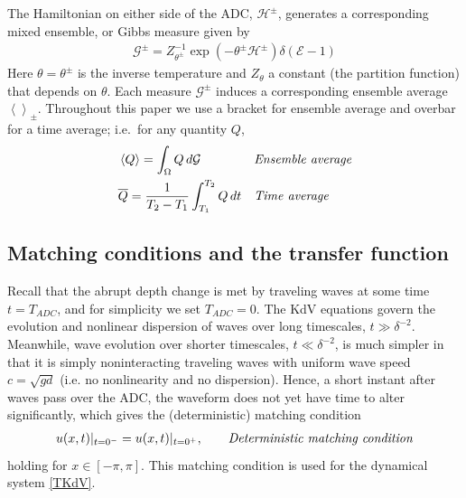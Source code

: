 \documentclass[11pt]{article}
\newcommand{\mean}[1]{\left< #1 \right>}
\newcommand{\depth}{d}
\newcommand{\En}{\mathcal{E}}
\newcommand{\Ham}{\mathcal{H}}
\newcommand{\Hupdn}{\Ham^{\pm}}
\newcommand{\Gibbs}{\mathcal{G}}
\newcommand{\Gupdn}{\Gibbs^{\pm}}
\newcommand{\thupdn}{\theta^{\pm}}
\newcommand{\tavg}[1]{\overline{#1}}
\begin{document}
The Hamiltonian on either side of the ADC, $\Ham^{\pm}$, generates a corresponding mixed ensemble, or Gibbs measure given by 
\begin{align}
\Gupdn = Z_{\thupdn}^{-1} \exp(-\thupdn \Hupdn) \delta(\En - 1)
\end{align}
Here $\theta = \thupdn$ is the inverse temperature and $Z_{\theta}$ a constant (the partition function) that depends on $\theta$. Each measure $\Gupdn$ induces a corresponding ensemble average $\mean{}_{\pm}$. Throughout this paper we use a bracket for ensemble average and overbar for a time average; i.e.~for any quantity $Q$,
\begin{align}
&\mean{Q} = \int_{\Omega}  Q \, d \Gibbs
&&\mbox{\em Ensemble average} \\
&\tavg{Q} = \frac{1}{T_2-T_1} \int_{T_1}^{T_2} Q \, dt	 
&&\mbox{\em Time average}
\end{align}



\subsection{Matching conditions and the transfer function}

Recall that the abrupt depth change is met by traveling waves at some time $t = T_{ADC}$, and for simplicity we set $T_{ADC} = 0$. The KdV equations govern the evolution and nonlinear dispersion of waves over long timescales, $t \gg \delta^{-2}$. Meanwhile, wave evolution over shorter timescales, $t \ll \delta^{-2}$, is much simpler in that it is simply noninteracting traveling waves with uniform wave speed $c = \sqrt{g \depth}$ (i.e. no nonlinearity and no dispersion). Hence, a short instant after waves pass over the ADC, the waveform does not yet have time to alter significantly, which gives the (deterministic) matching condition
\begin{align}
u(x,t) \vert_{t=0^-} = u(x,t) \vert_{t=0^+},
\qquad \mbox{\em Deterministic matching condition}
\end{align}
holding for $x \in [-\pi, \pi]$. This matching condition is used for the dynamical system \eqref{TKdV}.
\end{document}
